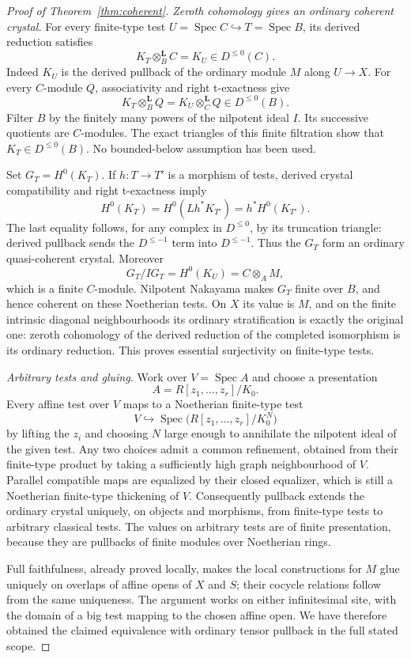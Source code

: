 \documentclass[11pt]{article}
\DeclareMathOperator{\Spec}{Spec}\DeclareMathOperator{\Hom}{Hom}
\theoremstyle{definition}\newtheorem{definition}[theorem]{Definition}
\theoremstyle{remark}\newtheorem{remark}[theorem]{Remark}
\begin{document}
\begin{proof}[Proof of Theorem~\ref{thm:coherent}]
\emph{Zeroth cohomology gives an ordinary coherent crystal.}
For every finite-type test $U=\Spec C\hookrightarrow T=\Spec B$, its derived reduction satisfies
\[
 K_T\otimes_B^{\mathbf L}C=K_U\in D^{\leq0}(C).
\]
Indeed $K_U$ is the derived pullback of the ordinary module $M$ along $U\to X$.  For every $C$-module $Q$, associativity and right t-exactness give
\[
                   K_T\otimes_B^{\mathbf L}Q
                   =K_U\otimes_C^{\mathbf L}Q\in D^{\leq0}(B).
\]
Filter $B$ by the finitely many powers of the nilpotent ideal $I$.  Its successive quotients are $C$-modules.  The exact triangles of this finite filtration show that $K_T\in D^{\leq0}(B)$.  No bounded-below assumption has been used.

Set $G_T=H^0(K_T)$.  If $h:T\to T'$ is a morphism of tests, derived crystal compatibility and right t-exactness imply
\[
 H^0(K_T)=H^0(Lh^*K_{T'})=h^*H^0(K_{T'}).
\]
The last equality follows, for any complex in $D^{\leq0}$, by its truncation triangle: derived pullback sends the $D^{\leq-1}$ term into $D^{\leq-1}$.  Thus the $G_T$ form an ordinary quasi-coherent crystal.  Moreover
\[
          G_T/IG_T=H^0(K_U)=C\otimes_AM,
\]
which is a finite $C$-module.  Nilpotent Nakayama makes $G_T$ finite over $B$, and hence coherent on these Noetherian tests.  On $X$ its value is $M$, and on the finite intrinsic diagonal neighbourhoods its ordinary stratification is exactly the original one: zeroth cohomology of the derived reduction of the completed isomorphism is its ordinary reduction.  This proves essential surjectivity on finite-type tests.

\emph{Arbitrary tests and gluing.}
Work over $V=\Spec A$ and choose a presentation
\[ A=R[z_1,\ldots,z_r]/K_0. \]
Every affine test over $V$ maps to a Noetherian finite-type test
\[
        V\hookrightarrow\Spec\bigl(R[z_1,\ldots,z_r]/K_0^N\bigr)
\]
by lifting the $z_i$ and choosing $N$ large enough to annihilate the nilpotent ideal of the given test.  Any two choices admit a common refinement, obtained from their finite-type product by taking a sufficiently high graph neighbourhood of $V$.  Parallel compatible maps are equalized by their closed equalizer, which is still a Noetherian finite-type thickening of $V$.  Consequently pullback extends the ordinary crystal uniquely, on objects and morphisms, from finite-type tests to arbitrary classical tests.  The values on arbitrary tests are of finite presentation, because they are pullbacks of finite modules over Noetherian rings.

Full faithfulness, already proved locally, makes the local constructions for $M$ glue uniquely on overlaps of affine opens of $X$ and $S$; their cocycle relations follow from the same uniqueness.  The argument works on either infinitesimal site, with the domain of a big test mapping to the chosen affine open.  We have therefore obtained the claimed equivalence with ordinary tensor pullback in the full stated scope.
\end{proof}
\end{document}
